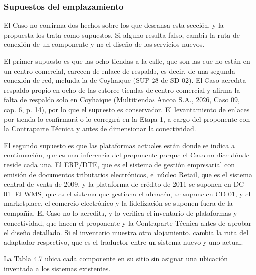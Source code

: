 \documentclass[11pt]{article}
\begin{document}
\subsubsection{Supuestos del emplazamiento}

El Caso no confirma dos hechos sobre los que descansa esta sección, y la propuesta los trata como supuestos. Si alguno resulta falso, cambia la ruta de conexión de un componente y no el diseño de los servicios nuevos.

El primer supuesto es que las ocho tiendas a la calle, que son las que no están en un centro comercial, carecen de enlace de respaldo, es decir, de una segunda conexión de red, incluida la de Coyhaique (SUP-28 de SD-02). El Caso acredita respaldo propio en ocho de las catorce tiendas de centro comercial y afirma la falta de respaldo solo en Coyhaique (Multitiendas Ancoa S.A., 2026, Caso 09, cap. 6, p. 14), por lo que el supuesto es conservador. El levantamiento de enlaces por tienda lo confirmará o lo corregirá en la Etapa 1, a cargo del proponente con la Contraparte Técnica y antes de dimensionar la conectividad.

El segundo supuesto es que las plataformas actuales están donde se indica a continuación, que es una inferencia del proponente porque el Caso no dice dónde reside cada una. El ERP/DTE, que es el sistema de gestión empresarial con emisión de documentos tributarios electrónicos, el núcleo Retail, que es el sistema central de venta de 2009, y la plataforma de crédito de 2011 se suponen en DC-01. El WMS, que es el sistema que gestiona el almacén, se supone en CD-01, y el marketplace, el comercio electrónico y la fidelización se suponen fuera de la compañía. El Caso no lo acredita, y lo verifica el inventario de plataformas y conectividad, que hacen el proponente y la Contraparte Técnica antes de aprobar el diseño detallado. Si el inventario muestra otro alojamiento, cambia la ruta del adaptador respectivo, que es el traductor entre un sistema nuevo y uno actual.

La Tabla 4.7 ubica cada componente en su sitio sin asignar una ubicación inventada a los sistemas existentes.

\par\vspace{0pt plus 10\baselineskip}\vspace{0pt plus -10\baselineskip}
\end{document}
